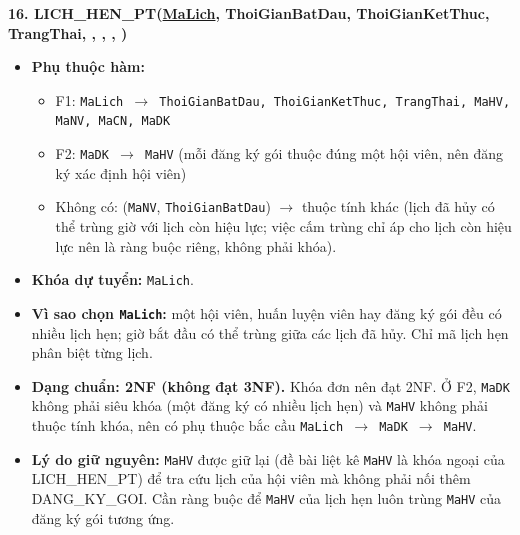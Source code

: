 \documentclass[11pt, a4paper]{article}
\newcommand{\pk}[1]{\bgroup\ULdepth=1.8pt\uline{#1}\egroup}
\newcommand{\fk}[1]{\bgroup\ULdepth=1.8pt\dashuline{#1}\egroup}
\begin{document}
\textbf{16. LICH\_HEN\_PT(\pk{MaLich}, ThoiGianBatDau, ThoiGianKetThuc, TrangThai, \fk{MaHV}, \fk{MaNV}, \fk{MaCN}, \fk{MaDK})}
\begin{itemize}
    \item \textbf{Phụ thuộc hàm:}
    \begin{itemize}
        \item F1: \texttt{MaLich $\rightarrow$ ThoiGianBatDau, ThoiGianKetThuc, TrangThai, MaHV, MaNV, MaCN, MaDK}
        \item F2: \texttt{MaDK $\rightarrow$ MaHV} (mỗi đăng ký gói thuộc đúng một hội viên, nên đăng ký xác định hội viên)
        \item Không có: (\texttt{MaNV}, \texttt{ThoiGianBatDau}) $\rightarrow$ thuộc tính khác (lịch đã hủy có thể trùng giờ với lịch còn hiệu lực; việc cấm trùng chỉ áp cho lịch còn hiệu lực nên là ràng buộc riêng, không phải khóa).
    \end{itemize}
    \item \textbf{Khóa dự tuyển:} \texttt{MaLich}.
    \item \textbf{Vì sao chọn \texttt{MaLich}:} một hội viên, huấn luyện viên hay đăng ký gói đều có nhiều lịch hẹn; giờ bắt đầu có thể trùng giữa các lịch đã hủy. Chỉ mã lịch hẹn phân biệt từng lịch.
    \item \textbf{Dạng chuẩn: 2NF (không đạt 3NF).} Khóa đơn nên đạt 2NF. Ở F2, \texttt{MaDK} không phải siêu khóa (một đăng ký có nhiều lịch hẹn) và \texttt{MaHV} không phải thuộc tính khóa, nên có phụ thuộc bắc cầu \texttt{MaLich $\rightarrow$ MaDK $\rightarrow$ MaHV}.
    \item \textbf{Lý do giữ nguyên:} \texttt{MaHV} được giữ lại (đề bài liệt kê \texttt{MaHV} là khóa ngoại của LICH\_HEN\_PT) để tra cứu lịch của hội viên mà không phải nối thêm DANG\_KY\_GOI. Cần ràng buộc để \texttt{MaHV} của lịch hẹn luôn trùng \texttt{MaHV} của đăng ký gói tương ứng.
\end{itemize}
\end{document}
